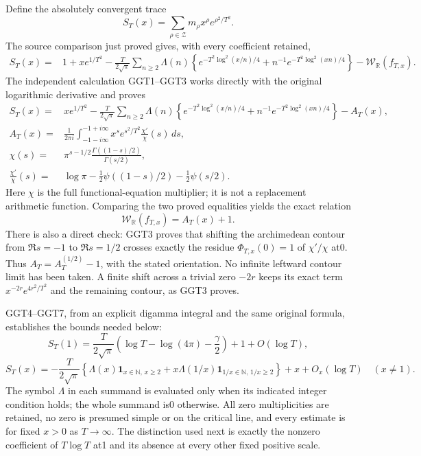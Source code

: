 Define the absolutely convergent trace \[
S_T(x)=\sum_{\rho\in\mathscr Z}m_\rho x^\rho e^{\rho^2/T^2}.
\tag{FPO4.1}
\] The source comparison just proved gives, with every coefficient
retained, \[
\begin{aligned}
S_T(x)={}&1+xe^{1/T^2}
 -\frac{T}{2\sqrt\pi}\sum_{n\ge2}\Lambda(n)
 \left\{e^{-T^2\log^2(x/n)/4}
       +n^{-1}e^{-T^2\log^2(xn)/4}\right\}
 -\mathcal W_{\mathbb R}(f_{T,x}).
\end{aligned}
\tag{FPO4.2}
\] The independent calculation GGT1--GGT3 works directly with the
original logarithmic derivative and proves \[
\begin{aligned}
S_T(x)={}&xe^{1/T^2}
 -\frac{T}{2\sqrt\pi}\sum_{n\ge2}\Lambda(n)
 \left\{e^{-T^2\log^2(x/n)/4}
       +n^{-1}e^{-T^2\log^2(xn)/4}\right\}-A_T(x),\\
A_T(x)={}&\frac1{2\pi i}\int_{-1-i\infty}^{-1+i\infty}
 x^s e^{s^2/T^2}\frac{\chi'}{\chi}(s)\,ds,\\
\chi(s)={}&\pi^{s-1/2}\frac{\Gamma((1-s)/2)}{\Gamma(s/2)},\\
\frac{\chi'}{\chi}(s)={}&\log\pi-\tfrac12\psi((1-s)/2)-\tfrac12\psi(s/2).
\end{aligned}
\tag{FPO4.3}
\] Here \(\chi\) is the full functional-equation multiplier; it is not a
replacement arithmetic function. Comparing the two proved equalities
yields the exact relation \[
\boxed{\mathcal W_{\mathbb R}(f_{T,x})=A_T(x)+1.}
\tag{FPO4.4}
\] There is also a direct check: GGT3 proves that shifting the
archimedean contour from \(\Re s=-1\) to \(\Re s=1/2\) crosses exactly
the residue \(\Phi_{T,x}(0)=1\) of \(\chi'/\chi\) at0. Thus
\(A_T=A_T^{(1/2)}-1\), with the stated orientation. No infinite leftward
contour limit has been taken. A finite shift across a trivial zero
\(-2r\) keeps its exact term \(x^{-2r}e^{4r^2/T^2}\) and the remaining
contour, as GGT3 proves.

GGT4--GGT7, from an explicit digamma integral and the same original
formula, establishes the bounds needed below: \[
S_T(1)=\frac{T}{2\sqrt\pi}
 \left(\log T-\log(4\pi)-\frac\gamma2\right)+1+O(\log T),
\tag{FPO4.5}
\] \[
S_T(x)=-\frac{T}{2\sqrt\pi}
 \left\{\Lambda(x)\mathbf1_{x\in\mathbb N,\,x\ge2}
       +x\Lambda(1/x)\mathbf1_{1/x\in\mathbb N,\,1/x\ge2}\right\}
 +x+O_x(\log T)\quad(x\ne1).
\tag{FPO4.6}
\] The symbol \(\Lambda\) in each summand is evaluated only when its
indicated integer condition holds; the whole summand is0 otherwise. All
zero multiplicities are retained, no zero is presumed simple or on the
critical line, and every estimate is for fixed \(x>0\) as
\(T\to\infty\). The distinction used next is exactly the nonzero
coefficient of \(T\log T\) at1 and its absence at every other fixed
positive scale.

